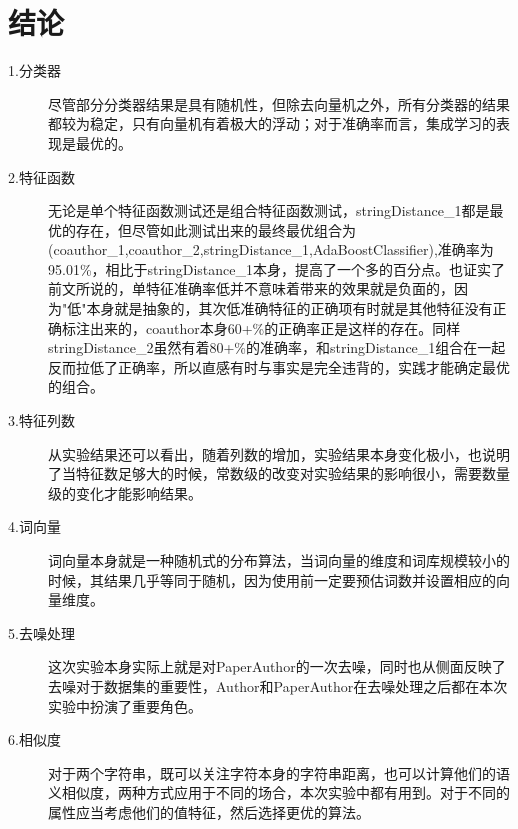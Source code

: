 \documentclass{mcmthesis}
\begin{document}
\section{结论}
\begin{description}
	\item [\qquad \quad 1.分类器] 尽管部分分类器结果是具有随机性，但除去向量机之外，所有分类器的结果都较为稳定，只有向量机有着极大的浮动；对于准确率而言，集成学习的表现是最优的。
	\item [\qquad \quad 2.特征函数] 无论是单个特征函数测试还是组合特征函数测试，stringDistance\_1都是最优的存在，但尽管如此测试出来的最终最优组合为(coauthor\_1,coauthor\_2,stringDistance\_1,AdaBoostClassifier),准确率为95.01\%，相比于stringDistance\_1本身，提高了一个多的百分点。也证实了前文所说的，单特征准确率低并不意味着带来的效果就是负面的，因为"低"本身就是抽象的，其次低准确特征的正确项有时就是其他特征没有正确标注出来的，coauthor本身60+\%的正确率正是这样的存在。同样stringDistance\_2虽然有着80+\%的准确率，和stringDistance\_1组合在一起反而拉低了正确率，所以直感有时与事实是完全违背的，实践才能确定最优的组合。
	\item [\qquad \quad 3.特征列数] 从实验结果还可以看出，随着列数的增加，实验结果本身变化极小，也说明了当特征数足够大的时候，常数级的改变对实验结果的影响很小，需要数量级的变化才能影响结果。
	\item [\qquad \quad 4.词向量] 词向量本身就是一种随机式的分布算法，当词向量的维度和词库规模较小的时候，其结果几乎等同于随机，因为使用前一定要预估词数并设置相应的向量维度。
	\item [\qquad \quad 5.去噪处理] 这次实验本身实际上就是对PaperAuthor的一次去噪，同时也从侧面反映了去噪对于数据集的重要性，Author和PaperAuthor在去噪处理之后都在本次实验中扮演了重要角色。
	\item [\qquad \quad 6.相似度] 对于两个字符串，既可以关注字符本身的字符串距离，也可以计算他们的语义相似度，两种方式应用于不同的场合，本次实验中都有用到。对于不同的属性应当考虑他们的值特征，然后选择更优的算法。
\end{description}
\end{document}
